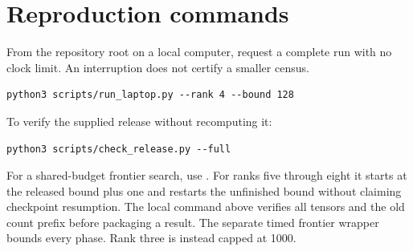 \documentclass[11pt,a4paper]{article}
\theoremstyle{definition}\newtheorem{definition}[theorem]{Definition}\newtheorem{remark}[theorem]{Remark}
\begin{document}
\par\noindent\begin{minipage}{\linewidth}
\section{Reproduction commands}
From the repository root on a local computer, request a complete run with no clock limit. An interruption does not certify a smaller census.
\par\noindent\begin{minipage}{\linewidth}
\begin{lstlisting}
python3 scripts/run_laptop.py --rank 4 --bound 128
\end{lstlisting}
\end{minipage}\par
To verify the supplied release without recomputing it:
\par\noindent\begin{minipage}{\linewidth}
\begin{lstlisting}
python3 scripts/check_release.py --full
\end{lstlisting}
\end{minipage}\par
For a shared-budget frontier search, use . For ranks five through eight it starts at the released bound plus one and restarts the unfinished bound without claiming checkpoint resumption. The local command above verifies all tensors and the old count prefix before packaging a result. The separate timed frontier wrapper bounds every phase. Rank three is instead capped at 1000.

\end{minipage}\par
\clearpage\appendix
\end{document}
